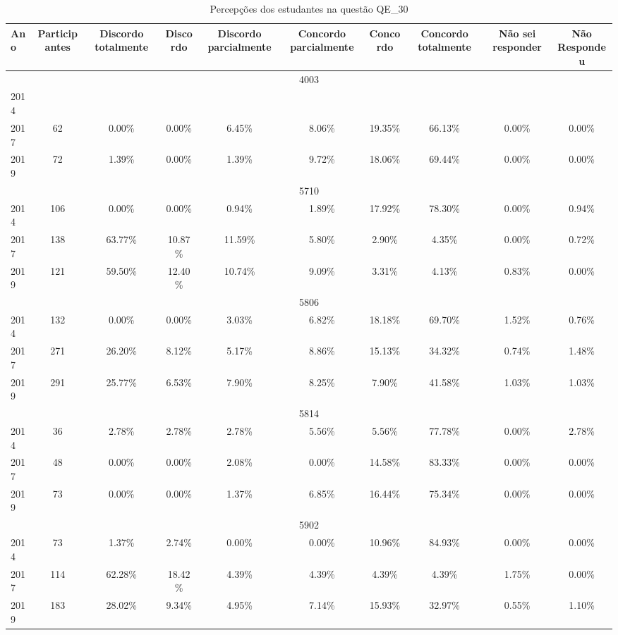 \begin{table}[H]
\centering
\caption{Percepções dos estudantes na questão QE\_30}
\begin{tabular}{|l|c|ccc|ccc|cc|}
\hline
\toprule
Ano & Participantes & Discordo totalmente & Discordo & Discordo parcialmente & Concordo parcialmente & Concordo & Concordo totalmente & Não sei responder & Não Respondeu \\
\midrule
\hline
\multicolumn{10}{|c|}{4003}\\
\hline
2014 & & & & & & & & & \\
2017 & 62 & 0.00\% & 0.00\% & 6.45\% & 8.06\% & 19.35\% & 66.13\% & 0.00\% & 0.00\%\\
2019 & 72 & 1.39\% & 0.00\% & 1.39\% & 9.72\% & 18.06\% & 69.44\% & 0.00\% & 0.00\%\\
\hline
\hline
\multicolumn{10}{|c|}{5710}\\
\hline
2014 & 106 & 0.00\% & 0.00\% & 0.94\% & 1.89\% & 17.92\% & 78.30\% & 0.00\% & 0.94\%\\
2017 & 138 & 63.77\% & 10.87\% & 11.59\% & 5.80\% & 2.90\% & 4.35\% & 0.00\% & 0.72\%\\
2019 & 121 & 59.50\% & 12.40\% & 10.74\% & 9.09\% & 3.31\% & 4.13\% & 0.83\% & 0.00\%\\
\hline
\hline
\multicolumn{10}{|c|}{5806}\\
\hline
2014 & 132 & 0.00\% & 0.00\% & 3.03\% & 6.82\% & 18.18\% & 69.70\% & 1.52\% & 0.76\%\\
2017 & 271 & 26.20\% & 8.12\% & 5.17\% & 8.86\% & 15.13\% & 34.32\% & 0.74\% & 1.48\%\\
2019 & 291 & 25.77\% & 6.53\% & 7.90\% & 8.25\% & 7.90\% & 41.58\% & 1.03\% & 1.03\%\\
\hline
\hline
\multicolumn{10}{|c|}{5814}\\
\hline
2014 & 36 & 2.78\% & 2.78\% & 2.78\% & 5.56\% & 5.56\% & 77.78\% & 0.00\% & 2.78\%\\
2017 & 48 & 0.00\% & 0.00\% & 2.08\% & 0.00\% & 14.58\% & 83.33\% & 0.00\% & 0.00\%\\
2019 & 73 & 0.00\% & 0.00\% & 1.37\% & 6.85\% & 16.44\% & 75.34\% & 0.00\% & 0.00\%\\
\hline
\hline
\multicolumn{10}{|c|}{5902}\\
\hline
2014 & 73 & 1.37\% & 2.74\% & 0.00\% & 0.00\% & 10.96\% & 84.93\% & 0.00\% & 0.00\%\\
2017 & 114 & 62.28\% & 18.42\% & 4.39\% & 4.39\% & 4.39\% & 4.39\% & 1.75\% & 0.00\%\\
2019 & 183 & 28.02\% & 9.34\% & 4.95\% & 7.14\% & 15.93\% & 32.97\% & 0.55\% & 1.10\%\\

\end{tabular}
\end{table}
